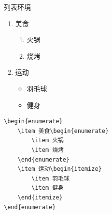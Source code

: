 \begin{frame}{列表环境}
\begin{minipage}[t]{0.43\linewidth}
\begin{enumerate}
			\item 美食\begin{enumerate}
				\item 火锅
				\item 烧烤
			\end{enumerate}
			\item 运动\begin{itemize}
				\item 羽毛球
				\item 健身
			\end{itemize}
		\end{enumerate}
\begin{lstlisting}
\begin{enumerate}
    \item 美食\begin{enumerate}
        \item 火锅
        \item 烧烤
    \end{enumerate}
    \item 运动\begin{itemize}
        \item 羽毛球
        \item 健身
    \end{itemize}
\end{enumerate}
\end{lstlisting}
	\end{minipage}

\end{frame}

